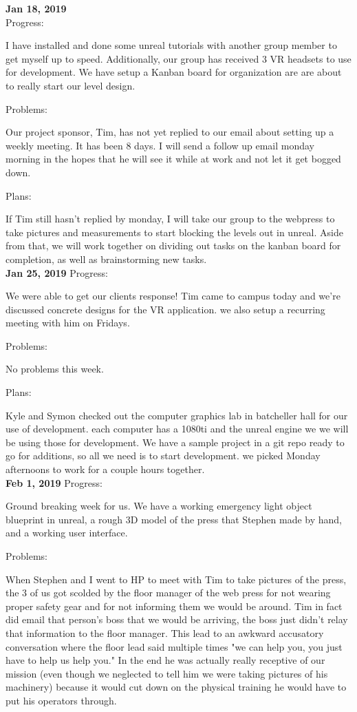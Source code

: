 \textbf{Jan 18, 2019}\\
Progress:

I have installed and done some unreal tutorials with another group member to get myself up to speed. Additionally, our group has received 3 VR headsets to use for development. We have setup a Kanban board for organization are are about to really start our level design.

Problems:

Our project sponsor, Tim, has not yet replied to our email about setting up a weekly meeting. It has been 8 days. I will send a follow up email monday morning in the hopes that he will see it while at work and not let it get bogged down.

Plans:

If Tim still hasn't replied by monday, I will take our group to the webpress to take pictures and measurements to start blocking the levels out in unreal. Aside from that, we will work together on dividing out tasks on the kanban board for completion, as well as brainstorming new tasks.\\

\textbf{Jan 25, 2019}
Progress:

We were able to get our clients response! Tim came to campus today and we're discussed concrete designs for the VR application. we also setup a recurring meeting with him on Fridays.

Problems:

No problems this week.

Plans:

Kyle and Symon checked out the computer graphics lab in batcheller hall for our use of development. each computer has a 1080ti and the unreal engine we we will be using those for development. We have a sample project in a git repo ready to go for additions, so all we need is to start development. we picked Monday afternoons to work for a couple hours together. \\

\textbf{Feb 1, 2019}
Progress:

Ground breaking week for us. We have a working emergency light object blueprint in unreal, a rough 3D model of the press that Stephen made by hand, and a working user interface.

Problems:

When Stephen and I went to HP to meet with Tim to take pictures of the press, the 3 of us got scolded by the floor manager of the web press for not wearing proper safety gear and for not informing them we would be around. Tim in fact did email that person's boss that we would be arriving, the boss just didn't relay that information to the floor manager. This lead to an awkward accusatory conversation where the floor lead said multiple times "we can help you, you just have to help us help you." In the end he was actually really receptive of our mission (even though we neglected to tell him we were taking pictures of his machinery) because it would cut down on the physical training he would have to put his operators through.

